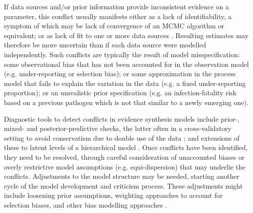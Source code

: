 \documentclass{article}
\begin{document}
If data sources and/or prior information provide inconsistent evidence on a parameter, this conflict usually manifests either as a lack of identifiability, a symptom of which may be lack of convergence of an MCMC algorithm or equivalent; or as lack of fit to one or more data sources \citep{presanis2013conflict,deangelis2018analysing}. Resulting estimates may therefore be more uncertain than if each data source were modelled independently. Such conflicts are typically the result of model misspecification: some observational bias that has not been accounted for in the observation model (e.g. under-reporting or selection bias); or some approximation in the process model that fails to explain the variation in the data (e.g. a fixed under-reporting proportion); or an unrealistic prior specification (e.g. an infection-fatality risk based on a previous pathogen which is not that similar to a newly emerging one).  

Diagnostic tools to detect conflicts in evidence synthesis models include prior-, mixed- and posterior-predictive checks, the latter often in a cross-validatory setting to avoid conservatism due to double use of the data \citep[][and references therein]{presanis2013conflict,yang2025detecting}; and extensions of these to latent levels of a hierarchical model \citep{yang2025detecting}. Once conflicts have been identified, they need to be resolved, through careful consideration of unaccounted biases or overly restrictive model assumptions (e.g. equi-dispersion) that may underlie the conflicts. Adjustments to the model structure may be needed, starting another cycle of the model development and criticism process. These adjustments might include loosening prior assumptions, weighting approaches to account for selection biases, and other bias modelling approaches \citep{deangelis2018analysing}.
\end{document}
